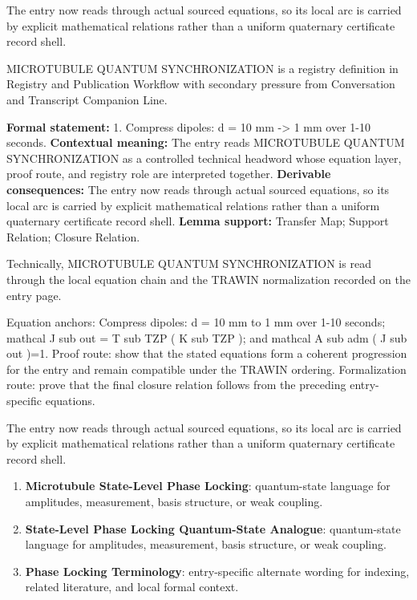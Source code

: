 The entry now reads through actual sourced equations, so its local arc is carried by explicit mathematical relations rather than a uniform quaternary certificate record shell.
\clearpage


\begingroup\small
{}
MICROTUBULE QUANTUM SYNCHRONIZATION is a registry definition in Registry and Publication Workflow with secondary pressure from Conversation and Transcript Companion Line.

\begingroup\footnotesize\setlength{\emergencystretch}{3em}\sloppy
\textbf{Formal statement:} 1. Compress dipoles: d = 10 mm -> 1 mm over 1-10 seconds. \textbf{Contextual meaning:} The entry reads MICROTUBULE QUANTUM SYNCHRONIZATION as a controlled technical headword whose equation layer, proof route, and registry role are interpreted together. \textbf{Derivable consequences:} The entry now reads through actual sourced equations, so its local arc is carried by explicit mathematical relations rather than a uniform quaternary certificate record shell. \textbf{Lemma support:} Transfer Map; Support Relation; Closure Relation.\par
\endgroup

Technically, MICROTUBULE QUANTUM SYNCHRONIZATION is read through the local equation chain and the TRAWIN normalization recorded on the entry page.

Equation anchors: Compress dipoles: d = 10 mm to 1 mm over 1-10 seconds; mathcal J sub out = T sub TZP ( K sub TZP ); and mathcal A sub adm ( J sub out )=1. Proof route: show that the stated equations form a coherent progression for the entry and remain compatible under the TRAWIN ordering. Formalization route: prove that the final closure relation follows from the preceding entry-specific equations.

The entry now reads through actual sourced equations, so its local arc is carried by explicit mathematical relations rather than a uniform quaternary certificate record shell.
\endgroup

\begin{enumerate}[leftmargin=1.6em,itemsep=6pt,topsep=4pt]
\item \textbf{Microtubule State-Level Phase Locking}: quantum-state language for amplitudes, measurement, basis structure, or weak coupling.
\item \textbf{State-Level Phase Locking Quantum-State Analogue}: quantum-state language for amplitudes, measurement, basis structure, or weak coupling.
\item \textbf{Phase Locking Terminology}: entry-specific alternate wording for indexing, related literature, and local formal context.
\end{enumerate}

